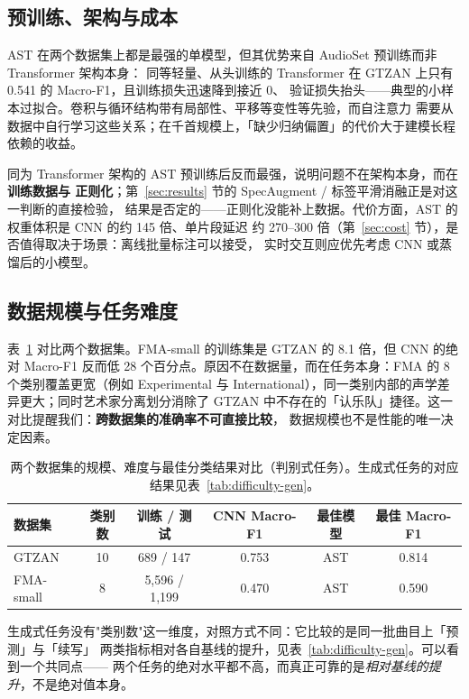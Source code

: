 \documentclass[UTF8,10pt,a4paper]{ctexart}
\begin{document}
\subsection{预训练、架构与成本}
AST 在两个数据集上都是最强的单模型，但其优势来自 AudioSet 预训练而非 Transformer 架构本身：
同等轻量、从头训练的 Transformer 在 GTZAN 上只有 0.541 的 Macro-F1，且训练损失迅速降到接近 0、
验证损失抬头——典型的小样本过拟合。卷积与循环结构带有局部性、平移等变性等先验，而自注意力
需要从数据中自行学习这些关系；在千首规模上，「缺少归纳偏置」的代价大于建模长程依赖的收益。

同为 Transformer 架构的 AST 预训练后反而最强，说明问题不在架构本身，而在\textbf{训练数据与
正则化}；第~\ref{sec:results} 节的 SpecAugment / 标签平滑消融正是对这一判断的直接检验，
结果是否定的——正则化没能补上数据。代价方面，AST 的权重体积是 CNN 的约 145 倍、单片段延迟
约 270--300 倍（第~\ref{sec:cost} 节），是否值得取决于场景：离线批量标注可以接受，
实时交互则应优先考虑 CNN 或蒸馏后的小模型。

\subsection{数据规模与任务难度}

表~\ref{tab:difficulty} 对比两个数据集。FMA-small 的训练集是 GTZAN 的 8.1 倍，但 CNN 的绝对
Macro-F1 反而低 28 个百分点。原因不在数据量，而在任务本身：FMA 的 8 个类别覆盖更宽（例如
Experimental 与 International），同一类别内部的声学差异更大；同时艺术家分离划分消除了
GTZAN 中不存在的「认乐队」捷径。这一对比提醒我们：\textbf{跨数据集的准确率不可直接比较}，
数据规模也不是性能的唯一决定因素。

\begin{table}[H]
\centering\small
\caption{两个数据集的规模、难度与最佳分类结果对比（判别式任务）。生成式任务的对应结果见表~\ref{tab:difficulty-gen}。}
\label{tab:difficulty}
\begin{tabular}{lccccc}
\toprule
数据集 & 类别数 & 训练 / 测试 & CNN Macro-F1 & 最佳模型 & 最佳 Macro-F1\\
\midrule
GTZAN & 10 & 689 / 147 & 0.753 & AST & 0.814\\
FMA-small & 8 & 5,596 / 1,199 & 0.470 & AST & 0.590\\
\bottomrule
\end{tabular}
\end{table}

生成式任务没有"类别数"这一维度，对照方式不同：它比较的是同一批曲目上「预测」与「续写」
两类指标相对各自基线的提升，见表~\ref{tab:difficulty-gen}。可以看到一个共同点——
两个任务的绝对水平都不高，而真正可靠的是\emph{相对基线的提升}，不是绝对值本身。
\end{document}
